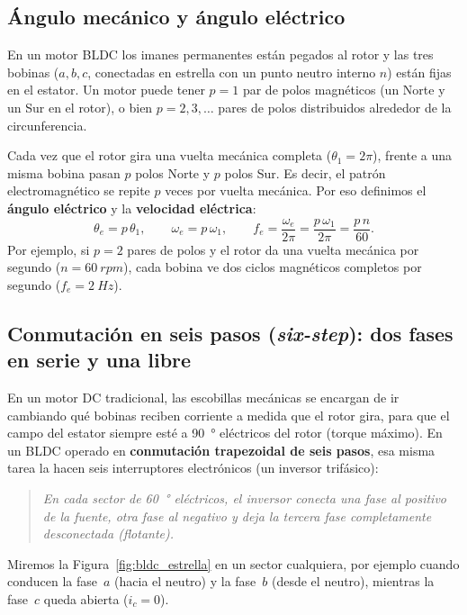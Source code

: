 \documentclass[11pt,a4paper,oneside]{book}
\begin{document}
\subsection{Ángulo mecánico y ángulo eléctrico}
En un motor BLDC los imanes permanentes están pegados al rotor y las tres
bobinas ($a, b, c$, conectadas en estrella con un punto neutro interno $n$)
están fijas en el estator. Un motor puede tener $p = 1$ par de polos magnéticos
(un Norte y un Sur en el rotor), o bien $p = 2, 3, \dots$ pares de polos
distribuidos alrededor de la circunferencia.

Cada vez que el rotor gira una vuelta mecánica completa ($\theta_1 = 2\pi$),
frente a una misma bobina pasan $p$ polos Norte y $p$ polos Sur. Es decir, el
patrón electromagnético se repite $p$ veces por vuelta mecánica. Por eso
definimos el \textbf{ángulo eléctrico} y la \textbf{velocidad eléctrica}:
\begin{equation}
  \theta_e = p\,\theta_1, \qquad \omega_e = p\,\omega_1, \qquad f_e = \frac{\omega_e}{2\pi} = \frac{p\,\omega_1}{2\pi} = \frac{p\,n}{60}.
  \label{eq:angulo_electrico}
\end{equation}
Por ejemplo, si $p = 2$ pares de polos y el rotor da una vuelta mecánica por
segundo ($n = \SI{60}{rpm}$), cada bobina ve dos ciclos magnéticos completos por
segundo ($f_e = \SI{2}{Hz}$).

\subsection{Conmutación en seis pasos (\emph{six-step}): dos fases en serie y una libre}
En un motor DC tradicional, las escobillas mecánicas se encargan de ir
cambiando qué bobinas reciben corriente a medida que el rotor gira, para que el
campo del estator siempre esté a \SI{90}{\degree} eléctricos del rotor (torque
máximo). En un BLDC operado en \textbf{conmutación trapezoidal de seis pasos},
esa misma tarea la hacen seis interruptores electrónicos (un inversor
trifásico):
\begin{quote}
  \emph{En cada sector de \SI{60}{\degree} eléctricos, el inversor conecta una
  fase al positivo de la fuente, otra fase al negativo y deja la tercera fase
  completamente desconectada (flotante).}
\end{quote}

Miremos la Figura~\ref{fig:bldc_estrella} en un sector cualquiera, por ejemplo
cuando conducen la fase~$a$ (hacia el neutro) y la fase~$b$ (desde el neutro),
mientras la fase~$c$ queda abierta ($i_c = 0$).
\end{document}

